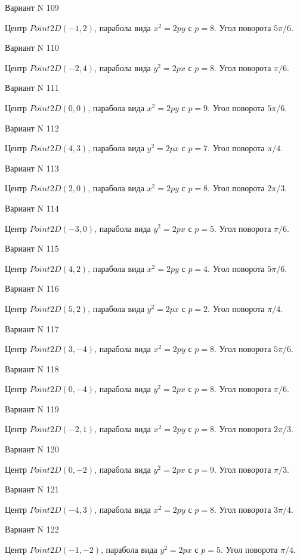 \documentclass[11pt]{report}
\begin{document}
Вариант N 109

Центр $Point2D\left(-1, 2\right)$, парабола вида $x^{2} = 2py$ с $p = 8$. Угол поворота $5 \pi / 6$.

Вариант N 110

Центр $Point2D\left(-2, 4\right)$, парабола вида $y^{2} = 2px$ с $p = 8$. Угол поворота $\pi / 6$.

Вариант N 111

Центр $Point2D\left(0, 0\right)$, парабола вида $x^{2} = 2py$ с $p = 9$. Угол поворота $5 \pi / 6$.

Вариант N 112

Центр $Point2D\left(4, 3\right)$, парабола вида $y^{2} = 2px$ с $p = 7$. Угол поворота $\pi / 4$.

Вариант N 113

Центр $Point2D\left(2, 0\right)$, парабола вида $x^{2} = 2py$ с $p = 8$. Угол поворота $2 \pi / 3$.

Вариант N 114

Центр $Point2D\left(-3, 0\right)$, парабола вида $y^{2} = 2px$ с $p = 5$. Угол поворота $\pi / 6$.

Вариант N 115

Центр $Point2D\left(4, 2\right)$, парабола вида $x^{2} = 2py$ с $p = 4$. Угол поворота $5 \pi / 6$.

Вариант N 116

Центр $Point2D\left(5, 2\right)$, парабола вида $y^{2} = 2px$ с $p = 2$. Угол поворота $\pi / 4$.

Вариант N 117

Центр $Point2D\left(3, -4\right)$, парабола вида $x^{2} = 2py$ с $p = 8$. Угол поворота $5 \pi / 6$.

Вариант N 118

Центр $Point2D\left(0, -4\right)$, парабола вида $y^{2} = 2px$ с $p = 8$. Угол поворота $\pi / 6$.

Вариант N 119

Центр $Point2D\left(-2, 1\right)$, парабола вида $x^{2} = 2py$ с $p = 8$. Угол поворота $2 \pi / 3$.

Вариант N 120

Центр $Point2D\left(0, -2\right)$, парабола вида $y^{2} = 2px$ с $p = 9$. Угол поворота $\pi / 3$.

Вариант N 121

Центр $Point2D\left(-4, 3\right)$, парабола вида $x^{2} = 2py$ с $p = 8$. Угол поворота $3 \pi / 4$.

Вариант N 122

Центр $Point2D\left(-1, -2\right)$, парабола вида $y^{2} = 2px$ с $p = 5$. Угол поворота $\pi / 4$.
\end{document}
